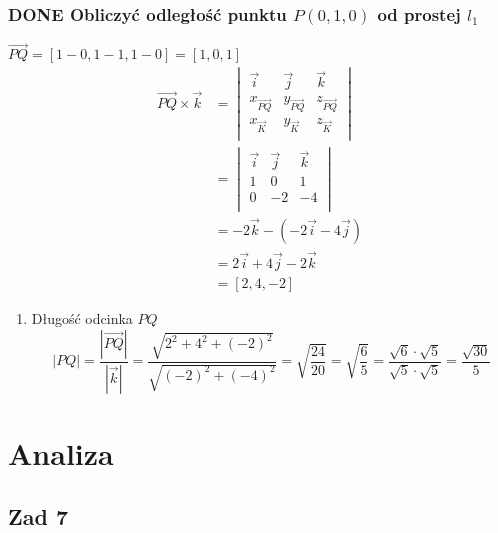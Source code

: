 \documentclass[11pt]{article}
\begin{document}
\subsubsection{{\bfseries\sffamily DONE} Obliczyć odległość punktu \(P(0,1,0)\) od prostej \(l_1\)}
\label{sec:org69b1d35}
\(\overrightarrow{PQ} = [1 -0 ,1 - 1,1  -0] = [ 1, 0, 1]\)
\begin{align*}
  \overrightarrow{PQ} \times \overrightarrow{k}
  &= \begin{vmatrix}
       \vec i & \vec j & \vec k\\
       x_{\overrightarrow{PQ}} & y_{\overrightarrow{PQ}} & z_{\overrightarrow{PQ}}\\
       x_{\vec{K}} & y_{\vec{K}} & z_{\vec{K}}\\
     \end{vmatrix}
  \\
  &= \begin{vmatrix}
       \vec i & \vec j & \vec k\\
       1 & 0 & 1\\
       0 & -2 & -4\\
     \end{vmatrix}
  \\
  &= -2 \vec k - (-2 \vec i -4 \vec j)
  \\
  &= 2 \vec i + 4 \vec j - 2 \vec k
  \\
  &= [2, 4, -2]
\end{align*}
\begin{enumerate}
\item Długość odcinka \(PQ\)
\label{sec:org5b9130e}
\[|PQ| = \frac{ |\overrightarrow{PQ}| }{ | \vec k | } =
  \frac{ \sqrt{2^{2} + 4^{2} + {(-2)}^{2}}}
  { \sqrt{ {(-2)}^{2} + {(-4)}^{2} } }
  = \sqrt{ \frac{24}{20} }
  = \sqrt{ \frac{6}{5} }
  = \frac{\sqrt{6} \cdot \sqrt{5} }{\sqrt{5} \cdot \sqrt{5}}
  = \frac{\sqrt{30}}{5}
\]
\end{enumerate}
\section{Analiza}
\label{sec:orge4063a9}
\subsection{Zad 7}
\label{sec:orgcd05568}
\end{document}
